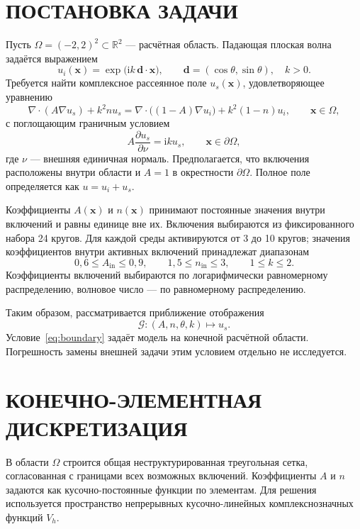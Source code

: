 \documentclass[notitle]{sibjima_preview}
\newcommand{\ii}{\mathrm{i}}
\newcommand{\R}{\mathbb{R}}
\begin{document}
\section{ПОСТАНОВКА ЗАДАЧИ}
Пусть \(\Omega=(-2,2)^2\subset\R^2\) --- расчётная область. Падающая плоская волна задаётся выражением
\begin{equation*}
u_i(\bm{x})=\exp\!\bigl(\ii k\,\bm{d}\cdot\bm{x}\bigr),
\qquad
\bm{d}=(\cos\theta,\sin\theta),\quad k>0.
\end{equation*}
Требуется найти комплексное рассеянное поле \(u_s(\bm{x})\), удовлетворяющее уравнению
\begin{equation}
\nabla\cdot(A\nabla u_s)+k^2n u_s
=
\nabla\cdot\bigl((1-A)\nabla u_i\bigr)+k^2(1-n)u_i,
\qquad \bm{x}\in\Omega,
\tag{1}\label{eq:helmholtz}
\end{equation}
с поглощающим граничным условием
\begin{equation}
A\frac{\partial u_s}{\partial\nu}=\ii k u_s,
\qquad \bm{x}\in\partial\Omega,
\tag{2}\label{eq:boundary}
\end{equation}
где \(\nu\) --- внешняя единичная нормаль. Предполагается, что включения расположены внутри области и \(A=1\) в окрестности \(\partial\Omega\). Полное поле определяется как \(u=u_i+u_s\).

Коэффициенты \(A(\bm{x})\) и \(n(\bm{x})\) принимают постоянные значения внутри включений и равны единице вне их. Включения выбираются из фиксированного набора 24 кругов. Для каждой среды активируются от 3 до 10 кругов; значения коэффициентов внутри активных включений принадлежат диапазонам
\begin{equation}
0{,}6\leq A_{\mathrm{in}}\leq0{,}9,\qquad
1{,}5\leq n_{\mathrm{in}}\leq3,\qquad
1\leq k\leq2.
\tag{3}\label{eq:ranges}
\end{equation}
Коэффициенты включений выбираются по логарифмически равномерному распределению, волновое число --- по равномерному распределению.

Таким образом, рассматривается приближение отображения
\begin{equation*}
\mathcal{G}:(A,n,\theta,k)\longmapsto u_s.
\end{equation*}
Условие~\eqref{eq:boundary} задаёт модель на конечной расчётной области. Погрешность замены внешней задачи этим условием отдельно не исследуется.

\section{КОНЕЧНО-ЭЛЕМЕНТНАЯ ДИСКРЕТИЗАЦИЯ}
В области \(\Omega\) строится общая неструктурированная треугольная сетка, согласованная с границами всех возможных включений. Коэффициенты \(A\) и \(n\) задаются как кусочно-постоянные функции по элементам. Для решения используется пространство непрерывных кусочно-линейных комплекснозначных функций \(V_h\).
\end{document}
